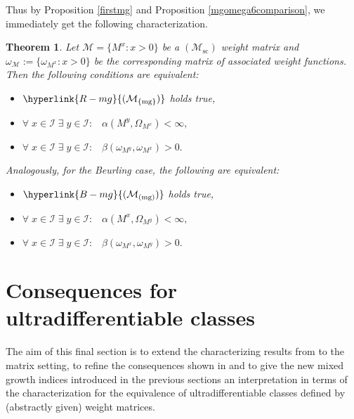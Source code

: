 \documentclass[10pt]{amsart}%
\numberwithin{equation}{section}
\theoremstyle{plain}
\newtheorem{theorem}[proposition]{Theorem}
\let\on=\operatorname
\begin{document}
Thus by Proposition \ref{firstmg} and Proposition \ref{mgomega6comparison}, we immediately get the following characterization.



\begin{theorem}\label{mixedmgcharact}
Let $\mathcal{M}=\{M^x: x>0\}$ be a \hyperlink{Msc}{$(\mathcal{M}_{\on{sc}})$} weight matrix and $\omega_{\mathcal{M}}:=\{\omega_{M^x}: x>0\}$ be the corresponding matrix of associated weight functions. Then the following conditions are equivalent:
\begin{itemize}
\item[$(i)$] $\hyperlink{R-mg}{(\mathcal{M}_{\{\on{mg}\}})}$ holds true,

\item[$(ii)$] $\forall\;x\in\mathcal{I}\;\exists\;y\in\mathcal{I}:\;\;\;\alpha(M^y,\Omega_{M^x}) <\infty,$

\item[$(iii)$] $\forall\;x\in\mathcal{I}\;\exists\;y\in\mathcal{I}:\;\;\;\beta(\omega_{M^y},\omega_{M^x})>0.$
\end{itemize}

Analogously, for the Beurling case, the following are equivalent:
\begin{itemize}
\item[$(i)$] $\hyperlink{B-mg}{(\mathcal{M}_{(\on{mg})})}$ holds true,

\item[$(ii)$] $\forall\;x\in\mathcal{I}\;\exists\;y\in\mathcal{I}:\;\;\;\alpha(M^x,\Omega_{M^y}) <\infty,$

\item[$(iii)$] $\forall\;x\in\mathcal{I}\;\exists\;y\in\mathcal{I}:\;\;\;\beta(\omega_{M^x},\omega_{M^y})>0.$
\end{itemize}
\end{theorem}


\section{Consequences for ultradifferentiable classes}\label{consequencesforultra}
The aim of this final section is to extend the characterizing results from \cite{BonetMeiseMelikhov07} to the matrix setting, to refine the consequences shown in \cite{testfunctioncharacterization} and to give the new mixed growth indices introduced in the previous sections an interpretation in terms of the characterization for the equivalence of ultradifferentiable classes defined by (abstractly given) weight matrices.
\end{document}
